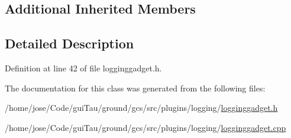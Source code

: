 \subsection*{Additional Inherited Members}


\subsection{Detailed Description}


Definition at line 42 of file logginggadget.\-h.



The documentation for this class was generated from the following files\-:\begin{DoxyCompactItemize}
\item 
/home/jose/\-Code/gui\-Tau/ground/gcs/src/plugins/logging/\hyperlink{logginggadget_8h}{logginggadget.\-h}\item 
/home/jose/\-Code/gui\-Tau/ground/gcs/src/plugins/logging/\hyperlink{logginggadget_8cpp}{logginggadget.\-cpp}\end{DoxyCompactItemize}
